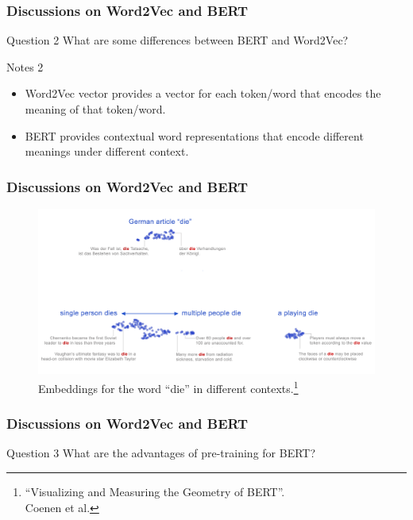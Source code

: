 \documentclass{beamer}
\begin{document}
\begin{frame}
    \frametitle{Discussions on Word2Vec and BERT}
    \begin{block}{Question 2}
        What are some differences between BERT and Word2Vec?
    \end{block}
    
    \begin{block}{Notes 2}
        \begin{itemize}
            \item Word2Vec vector provides a vector for each token/word that encodes the meaning of that token/word. 
            \item BERT provides contextual word representations that encode different meanings under different context.
        \end{itemize}
    \end{block}
\end{frame}

\begin{frame}
    \frametitle{Discussions on Word2Vec and BERT}
    \begin{figure}
        \includegraphics[scale=0.08]{visualize-bert}
        \caption{\footnotesize Embeddings for the word ``die'' in different contexts.\footnote{\tiny ``Visualizing and Measuring the Geometry of BERT''.\\ Coenen et al.}}
    \end{figure}
\end{frame}

\begin{frame}
    \frametitle{Discussions on Word2Vec and BERT}
    \begin{block}{Question 3}
        What are the advantages of pre-training for BERT? 
    \end{block}
\end{frame}
\end{document}
